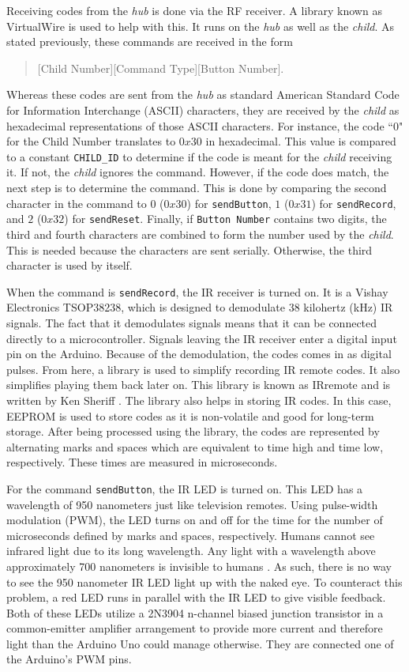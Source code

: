 \documentclass[12pt]{article}
\begin{document}
 Receiving codes from the \emph{hub} is done via the RF receiver. A library known as VirtualWire \cite{virtualwire} is used to help with this. It runs on the \emph{hub} as well as the \emph{child}. As stated previously, these commands are received in the form
 \begin{quote}
 [Child Number][Command Type][Button Number].
 \end{quote}
Whereas these codes are sent from the \emph{hub} as standard American Standard Code for Information Interchange (ASCII) characters, they are received by the \emph{child} as hexadecimal representations of those ASCII characters. For instance, the code ``0" for the Child Number translates to $0x30$ in hexadecimal. This value is compared to a constant \texttt{CHILD\_ID} to determine if the code is meant for the \emph{child} receiving it. If not, the \emph{child} ignores the command. However, if the code does match, the next step is to determine the command. This is done by comparing the second character in the command to $0$ ($0x30$) for \texttt{sendButton}, $1$ ($0x31$) for \texttt{sendRecord}, and $2$ ($0x32$) for \texttt{sendReset}. Finally, if \texttt{Button Number} contains two digits, the third and fourth characters are combined to form the number used by the \emph{child}. This is needed because the characters are sent serially. Otherwise, the third character is used by itself.    
 
 When the command is \texttt{sendRecord}, the IR receiver is turned on. It is a Vishay Electronics TSOP38238, which is designed to demodulate 38 kilohertz (kHz) IR signals. The fact that it demodulates signals means that it can be connected directly to a microcontroller. Signals leaving the IR receiver enter a digital input pin on the Arduino. Because of the demodulation, the codes comes in as digital pulses.  From here, a library is used to simplify recording IR remote codes. It also simplifies playing them back later on. This library is known as IRremote and is written by Ken Sheriff \cite{irremote}. The library also helps in storing IR codes. In this case, EEPROM is used to store codes as it is non-volatile and good for long-term storage. After being processed using the library, the codes are represented by alternating marks and spaces which are equivalent to time high and time low, respectively. These times are measured in microseconds.

 For the command \texttt{sendButton}, the IR LED is turned on. This LED has a wavelength of 950 nanometers just like television remotes. Using pulse-width modulation (PWM), the LED turns on and off for the time for the number of microseconds defined by marks and spaces, respectively. Humans cannot see infrared light due to its long wavelength. Any light with a wavelength above approximately 700 nanometers is invisible to humans \cite{nasa}. As such, there is no way to see the 950 nanometer IR LED light up with the naked eye. To counteract this problem, a red LED runs in parallel with the IR LED to give visible feedback. Both of these LEDs utilize a 2N3904 n-channel biased junction transistor in a common-emitter amplifier arrangement to provide more current and therefore light than the Arduino Uno could manage otherwise. They are connected one of the Arduino's PWM pins. 
 
\end{document}
